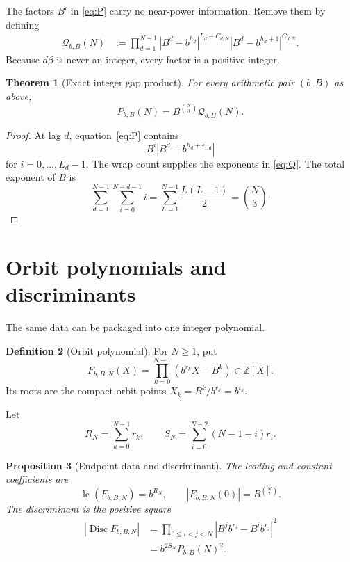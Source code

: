 \documentclass[11pt,oneside]{article}
\newtheorem{theorem}{Theorem}[section]
\newtheorem{proposition}[theorem]{Proposition}
\theoremstyle{definition}
\newtheorem{definition}[theorem]{Definition}
\theoremstyle{remark}
\newcommand{\Z}{\mathbb Z}
\begin{document}
The factors $B^i$ in \eqref{eq:P} carry no near-power information.  Remove them by defining
\begin{align}
 \mathcal Q_{b,B}(N)
 &:=\prod_{d=1}^{N-1}
 |B^d-b^{h_d}|^{L_d-C_{d,N}}
 |B^d-b^{h_d+1}|^{C_{d,N}}.
 \label{eq:Q}
\end{align}
Because $d\beta$ is never an integer, every factor is a positive integer.

\begin{theorem}[Exact integer gap product]
\label{thm:gap-product}
For every arithmetic pair $(b,B)$ as above,
\begin{equation}
 P_{b,B}(N)=B^{\binom N3}\mathcal Q_{b,B}(N).
 \label{eq:P-Q}
\end{equation}
\end{theorem}

\begin{proof}
At lag $d$, equation~\eqref{eq:P} contains
\[
 B^i|B^d-b^{h_d+\varepsilon_{i,d}}|
\]
for $i=0,\ldots,L_d-1$.  The wrap count supplies the exponents in
\eqref{eq:Q}.  The total exponent of $B$ is
\[
 \sum_{d=1}^{N-1}\sum_{i=0}^{N-d-1}i
 =\sum_{L=1}^{N-1}\frac{L(L-1)}2
 =\binom N3.
\]
\end{proof}

\section{Orbit polynomials and discriminants}
\label{sec:polynomials}

The same data can be packaged into one integer polynomial.

\begin{definition}[Orbit polynomial]
For $N\ge1$, put
\begin{equation}
 F_{b,B,N}(X)=\prod_{k=0}^{N-1}(b^{r_k}X-B^k)\in\Z[X].
 \label{eq:orbit-polynomial}
\end{equation}
Its roots are the compact orbit points $X_k=B^k/b^{r_k}=b^{t_k}$.
\end{definition}

Let
\begin{equation}
 R_N=\sum_{k=0}^{N-1}r_k,
 \qquad
 S_N=\sum_{i=0}^{N-2}(N-1-i)r_i.
 \label{eq:RS}
\end{equation}

\begin{proposition}[Endpoint data and discriminant]
\label{prop:orbit-disc}
The leading and constant coefficients are
\begin{equation}
 \operatorname{lc}(F_{b,B,N})=b^{R_N},
 \qquad
 |F_{b,B,N}(0)|=B^{\binom N2}.
 \label{eq:endpoints}
\end{equation}
The discriminant is the positive square
\begin{align}
 |\operatorname{Disc}F_{b,B,N}|
 &=\prod_{0\le i<j<N}
 |B^j b^{r_i}-B^i b^{r_j}|^2 \\
 &=b^{2S_N}P_{b,B}(N)^2.
 \label{eq:disc}
\end{align}
\end{proposition}
\end{document}
